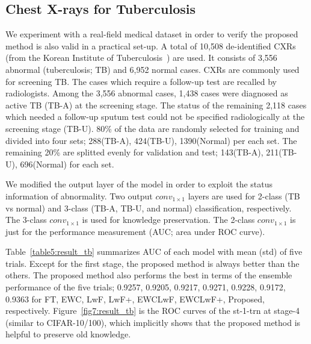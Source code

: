 \documentclass[runningheads,a4paper]{llncs}
\begin{document}
\subsection{Chest X-rays for Tuberculosis}

We experiment with a real-field medical dataset in order to verify the proposed method is also valid in a practical set-up. A total of 10,508 de-identified CXRs (from the Korean Institute of Tuberculosis~\cite{r15_tb_spie2016}) are used. It consists of 3,556 abnormal (tuberculosis; TB) and 6,952 normal cases. CXRs are commonly used for screening TB. The cases which require a follow-up test are recalled by radiologists. Among the 3,556 abnormal cases, 1,438 cases were diagnosed as active TB (TB-A) at the screening stage. The status of the remaining 2,118 cases which needed a follow-up sputum test could not be specified radiologically at the screening stage (TB-U). 80\% of the data are randomly selected for training and divided into four sets; 288(TB-A), 424(TB-U), 1390(Normal) per each set. The remaining 20\% are splitted evenly for validation and test; 143(TB-A), 211(TB-U), 696(Normal) for each set.

We modified the output layer of the model in order to exploit the status information of abnormality. Two output $conv_{1\times1}$ layers are used for 2-class (TB vs normal) and 3-class (TB-A, TB-U, and normal) classification, respectively. The 3-class $conv_{1\times1}$ is used for knowledge preservation. The 2-class $conv_{1\times1}$ is just for the performance measurement (AUC; area under ROC curve).

Table~\ref{table5:result_tb} summarizes AUC of each model with mean (std) of five trials. Except for the first stage, the proposed method  is always better than the others. The proposed method also performs the best in terms of the ensemble performance of the five trials; 0.9257, 0.9205, 0.9217, 0.9271, 0.9228, 0.9172, 0.9363 for FT, EWC, LwF, LwF+, EWCLwF, EWCLwF+, Proposed, respectively.  Figure~\ref{fig7:result_tb} is the ROC curves of the st-1-trn at stage-4 (similar to CIFAR-10/100), which implicitly shows that the proposed method is helpful to preserve old knowledge.
\end{document}
